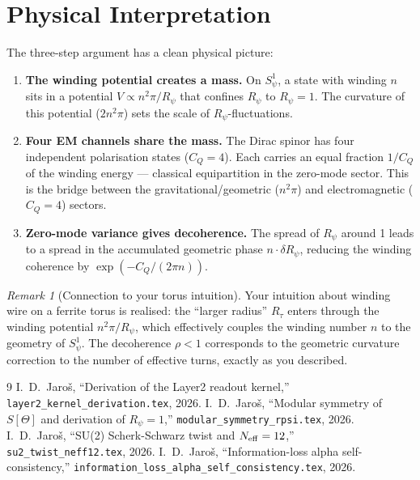 \documentclass[12pt,a4paper]{article}
\theoremstyle{definition}\newtheorem{definition}[theorem]{Definition}
\theoremstyle{remark}\newtheorem{remark}[theorem]{Remark}
\begin{document}
\section{Physical Interpretation}
\label{sec:phys}

The three-step argument has a clean physical picture:

\begin{enumerate}
\item \textbf{The winding potential creates a mass.}
  On $S^1_\psi$, a state with winding $n$ sits in a potential
  $V \propto n^2\pi/R_\psi$ that confines $R_\psi$ to $R_\psi=1$.
  The curvature of this potential ($2n^2\pi$) sets the scale of
  $R_\psi$-fluctuations.

\item \textbf{Four EM channels share the mass.}
  The Dirac spinor has four independent polarisation states
  ($C_Q=4$). Each carries an equal fraction $1/C_Q$ of the
  winding energy — classical equipartition in the zero-mode sector.
  This is the bridge between the gravitational/geometric ($n^2\pi$)
  and electromagnetic ($C_Q=4$) sectors.

\item \textbf{Zero-mode variance gives decoherence.}
  The spread of $R_\psi$ around 1 leads to a spread in the
  accumulated geometric phase $n\cdot\delta R_\psi$, reducing the
  winding coherence by $\exp(-C_Q/(2\pi n))$.
\end{enumerate}

\begin{remark}[Connection to your torus intuition]
Your intuition about winding wire on a ferrite torus is realised:
the ``larger radius'' $R_\tau$ enters through the winding potential
$n^2\pi/R_\psi$, which effectively couples the winding number $n$
to the geometry of $S^1_\psi$.  The decoherence $\rho < 1$
corresponds to the geometric curvature correction to the number
of effective turns, exactly as you described.
\end{remark}

\begin{thebibliography}{9}
  I.~D.~Jaroš, ``Derivation of the Layer2 readout kernel,''
  \texttt{layer2\_kernel\_derivation.tex}, 2026.
  I.~D.~Jaroš, ``Modular symmetry of $S[\Theta]$ and derivation
  of $R_\psi=1$,'' \texttt{modular\_symmetry\_rpsi.tex}, 2026.
  I.~D.~Jaroš, ``SU(2) Scherk-Schwarz twist and $N_{\rm eff}=12$,''
  \texttt{su2\_twist\_neff12.tex}, 2026.
  I.~D.~Jaroš, ``Information-loss alpha self-consistency,''
  \texttt{information\_loss\_alpha\_self\_consistency.tex}, 2026.
\end{thebibliography}

\ifdefined\INCLUDEMODE\else
\end{document}
